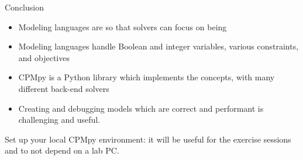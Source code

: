\documentclass{cons-beamer}
\begin{document}
\begin{frame}{Conclusion}

	\begin{itemize}
		\item Modeling languages are  so that solvers can focus on being 
		\item Modeling languages handle Boolean and integer variables, various constraints, and objectives
		\item CPMpy is a Python library which implements the concepts, with many different back-end solvers
		\item Creating and debugging models which are correct and performant is challenging and useful.
	\end{itemize}

	\vfill
	Set up your local CPMpy environment: it will be useful for the exercise sessions and to not depend on a lab PC.

	
\end{frame}
\end{document}
